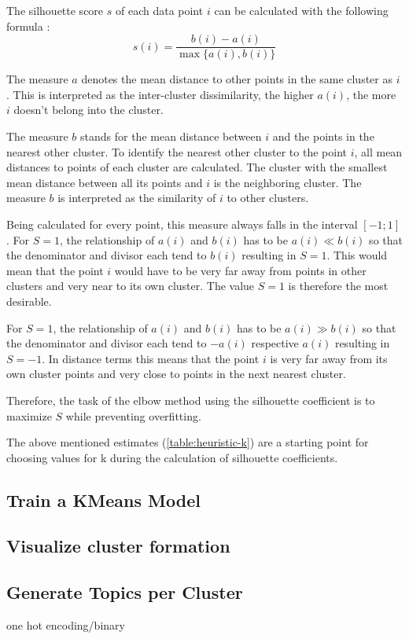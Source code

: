 The silhouette score $s$ of each data point $i$ can be calculated with the following formula \cite{kodinariyaReviewDeterminingCluster2013}:
\[ s(i) = \frac{b(i) - a(i)}{\max\{a(i),b(i)\}} \]

The measure $a$ denotes the mean distance to other points in the same cluster as $i$. This is interpreted as the inter-cluster dissimilarity, the higher $a(i)$, the more $i$ doesn't belong into the cluster.

The measure $b$ stands for the mean distance between $i$ and the points in the nearest other cluster. To identify the nearest other cluster to the point $i$, all mean distances to points of each cluster are calculated. The cluster with the smallest mean distance between all its points and $i$ is the neighboring cluster. The measure $b$ is interpreted as the similarity of $i$ to other clusters.

Being calculated for every point, this measure always falls in the interval $[-1;1]$. For $S = 1$, the relationship of $a(i)$ and $b(i)$ has to be $a(i) \ll b(i)$ so that the denominator and divisor each tend to $b(i)$ resulting in $S = 1$. This would mean that the point $i$ would have to be very far away from points in other clusters and very near to its own cluster. The value $S = 1$ is therefore the most desirable.

For $S = 1$, the relationship of $a(i)$ and $b(i)$ has to be $a(i) \gg b(i)$ so that the denominator and divisor each tend to $-a(i)$ respective $a(i)$ resulting in $S = -1$. In distance terms this means that the point $i$ is very far away from its own cluster points and very close to points in the next nearest cluster.

Therefore, the task of the elbow method using the silhouette coefficient is to maximize $S$ while preventing overfitting.

The above mentioned estimates (\ref{table:heuristic-k}) are a starting point for choosing values for k during the calculation of silhouette coefficients.


\subsection{Train a KMeans Model}

\subsection{Visualize cluster formation}
\subsection{Generate Topics per Cluster}

one hot encoding/binary


		